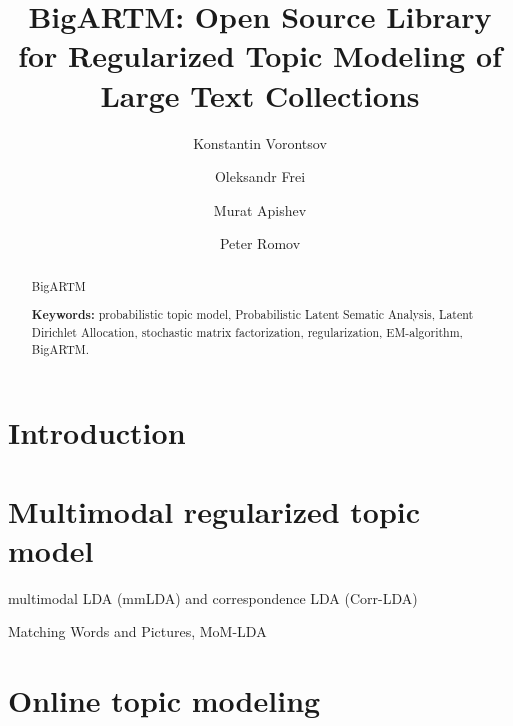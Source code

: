 \documentclass{llncs}
\begin{document}
\title{
    BigARTM: Open Source Library for
    Regularized %
    Topic Modeling
    of Large Text Collections
}
\author{
    Konstantin Vorontsov
    \and
    Oleksandr Frei
    \and
    Murat Apishev
    \and
    Peter Romov
}

\maketitle

\begin{abstract}
    BigARTM

\vspace{1em}
\textbf{Keywords:}
    probabilistic topic model,
    Probabilistic Latent Sematic Analysis,
    Latent Dirichlet Allocation,
    stochastic matrix factorization,
    regularization,
    EM-algorithm,
    BigARTM.
\end{abstract}

\section{Introduction}
\cite{hofmann99plsi}
\cite{blei03latent}
\cite{asuncion09smoothing}

\cite{voron14dan-eng}
\cite{voron14aist}
\cite{voron14mlj}

\section{Multimodal regularized topic model}
\label{sec:Multimodal}

multimodal LDA (mmLDA) and correspondence LDA (Corr-LDA)
\cite{blei03modeling}

Matching Words and Pictures, MoM-LDA
\cite{barnard03matching}

\cite{rubin12statistical}

\cite{virtanen12factorized}

\cite{roller13multimodal}


\section{Online topic modeling}
\label{sec:Online}
\end{document}
